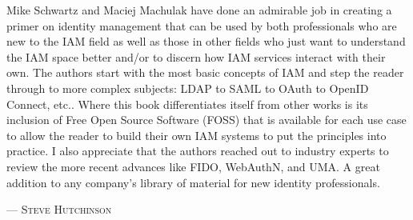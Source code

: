 Mike Schwartz and Maciej Machulak have done an admirable job in creating a primer on identity management that can be used by both professionals who are new to the IAM field as well as those in other fields who just want to understand the IAM space better and/or to discern how IAM services interact with their own. The authors start with the most basic concepts of IAM and step the reader through to more complex subjects: LDAP to SAML to OAuth to OpenID Connect, etc.. Where this book differentiates itself from other works is its inclusion of Free Open Source Software (FOSS) that is available for each use case to allow the reader to build their own IAM systems to put the principles into practice. I also appreciate that the authors reached out to industry experts to review the more recent advances like FIDO, WebAuthN, and UMA. A great addition to any company’s library of material for new identity professionals. 
\setlength{\parindent}{0cm}\par\textsc{ --- Steve Hutchinson }\par\vspace{12pt}\setlength{\parindent}{15pt}
